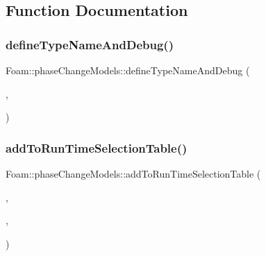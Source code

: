 \subsection{Function Documentation}
\mbox{\label{namespaceFoam_1_1phaseChangeModels_a3ab3a62ddc69c6b520ef8ff616515733}} 
\subsubsection{\texorpdfstring{define\+Type\+Name\+And\+Debug()}{defineTypeNameAndDebug()}\hspace{0.1cm}{\footnotesize\ttfamily [1/2]}}
{\footnotesize\ttfamily Foam\+::phase\+Change\+Models\+::define\+Type\+Name\+And\+Debug (\begin{DoxyParamCaption}\item[{\hyperlink{classFoam_1_1phaseChangeModels_1_1forcedConstantPhaseChange}{forced\+Constant\+Phase\+Change}}]{,  }\item[{0}]{ }\end{DoxyParamCaption})}

\mbox{\label{namespaceFoam_1_1phaseChangeModels_a94d7cb9ce316dd857faa3c8e485c809c}} 
\subsubsection{\texorpdfstring{add\+To\+Run\+Time\+Selection\+Table()}{addToRunTimeSelectionTable()}\hspace{0.1cm}{\footnotesize\ttfamily [1/2]}}
{\footnotesize\ttfamily Foam\+::phase\+Change\+Models\+::add\+To\+Run\+Time\+Selection\+Table (\begin{DoxyParamCaption}\item[{\hyperlink{classFoam_1_1phaseChangeModel}{phase\+Change\+Model}}]{,  }\item[{\hyperlink{classFoam_1_1phaseChangeModels_1_1forcedConstantPhaseChange}{forced\+Constant\+Phase\+Change}}]{,  }\item[{phase\+Change\+Models}]{ }\end{DoxyParamCaption})}

